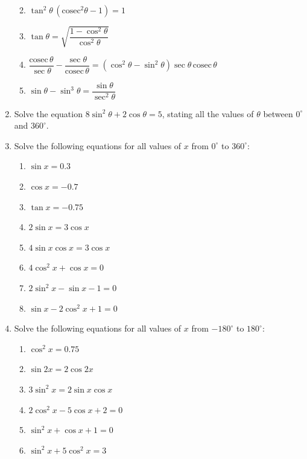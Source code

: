 \documentclass[
  12pt,
  oneside]{book}
\providecommand{\tightlist}{%
  \setlength{\itemsep}{0pt}\setlength{\parskip}{0pt}}
\theoremstyle{definition}
\theoremstyle{definition}
\theoremstyle{definition}
\theoremstyle{definition}
\theoremstyle{remark}
\begin{document}
\begin{enumerate}
  \begin{enumerate}
  \def\labelenumii{\roman{enumii})}
  \tightlist
  \item
    \(\tan^2\theta\,(\mathrm{cosec}^2\theta -1)=1\)
  \item
    \(\tan\theta = \sqrt{\dfrac{1-\cos^2\theta}{\cos^2\theta}}\)
  \item
    \(\dfrac{\mathrm{cosec}\,\theta}{\sec\theta}-\dfrac{\sec\theta}{\mathrm{cosec}\,\theta} = (\cos^2\theta-\sin^2\theta)\sec\theta\,\mathrm{cosec}\,\theta\)
  \item
    \(\sin\theta-\sin^3\theta = \dfrac{\sin\theta}{\sec^2\theta}\)
  \end{enumerate}
\item
  Solve the equation \(8 \sin^2\theta + 2 \cos\theta = 5\), stating all the values of \(\theta\) between \(0^\circ\) and \(360^\circ\).
\item
  Solve the following equations for all values of \(x\) from \(0^\circ\) to \(360^\circ\):

  \begin{enumerate}
  \def\labelenumii{\alph{enumii})}
  \tightlist
  \item
    \(\sin x=0.3\)
  \item
    \(\cos x=-0.7\)
  \item
    \(\tan x=-0.75\)
  \item
    \(2\sin x=3\cos x\)
  \item
    \(4\sin x\cos x = 3\cos x\)
  \item
    \(4\cos^2 x+\cos x = 0\)
  \item
    \(2\sin^2 x-\sin x-1=0\)
  \item
    \(\sin x-2\cos^2 x+1=0\)
  \end{enumerate}
\item
  Solve the following equations for all values of \(x\) from \(-180^\circ\) to \(180^\circ\):

  \begin{enumerate}
  \def\labelenumii{\alph{enumii})}
  \tightlist
  \item
    \(\cos^2 x=0.75\)
  \item
    \(\sin 2x = 2\cos 2x\)
  \item
    \(3\sin^2 x=2\sin x\cos x\)
  \item
    \(2\cos^2 x-5\cos x+2=0\)
  \item
    \(\sin^2 x+\cos x+1=0\)
  \item
    \(\sin^2 x+5\cos^2 x =3\)
  \end{enumerate}
\end{enumerate}
\end{document}

